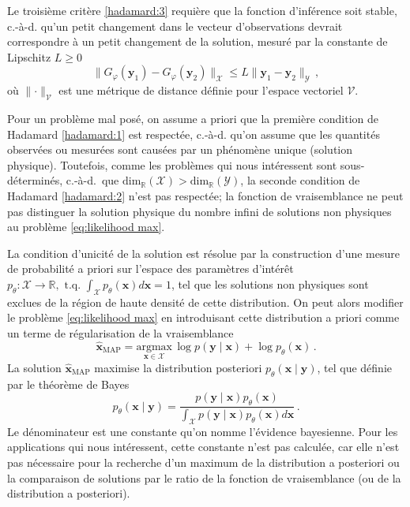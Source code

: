 Le troisième critère \ref{hadamard:3} requière que la fonction d'inférence soit stable, c.-à-d. qu'un petit changement 
dans le vecteur d'observations devrait correspondre à un petit changement de la solution, mesuré par la constante de Lipschitz
$L \geq 0$
\begin{equation}\label{eq:Lipschitz}
        \lVert G_\varphi(\mathbf{y}_1) - G_\varphi(\mathbf{y}_2)\rVert_{\mathcal{X}} \leq L \lVert \mathbf{y}_1 - \mathbf{y}_2\rVert_{\mathcal{Y}}\, ,
\end{equation}
où $\lVert \cdot \rVert_{\mathcal{V}}$ est une métrique de distance définie pour l'espace vectoriel $\mathcal{V}$.

Pour un problème mal posé,
on assume a priori que la première condition de Hadamard \ref{hadamard:1} est respectée, c.-à-d. qu'on assume 
que les quantités observées ou mesurées sont causées par un phénomène unique (solution physique). 
Toutefois, comme les problèmes qui nous intéressent sont sous-déterminés, 
c.-à-d.\ que $\mathrm{dim}_{\mathbb{R}}(\mathcal{X}) > \mathrm{dim}_{\mathbb{R}}(\mathcal{Y})$,
la seconde condition de Hadamard \ref{hadamard:2} n'est pas respectée; la fonction de vraisemblance 
ne peut pas distinguer la solution physique du nombre infini de solutions non physiques au problème \eqref{eq:likelihood max}.

La condition d'unicité de la solution est résolue par la construction d'une
mesure de probabilité a priori sur l'espace des paramètres d'intérêt 
$p_\theta: \mathcal{X} \rightarrow \mathbb{R}, \,\, \mathrm{t.q.}\,\, \int_{\mathcal{X}} p_\theta(\mathbf{x}) d\mathbf{x} = 1$,
tel que les solutions non physiques sont exclues de la région de haute densité de cette distribution.
On peut alors modifier le problème \eqref{eq:likelihood max} en introduisant cette distribution 
a priori comme un terme de régularisation de la vraisemblance
\begin{equation}\label{eq:MAP intro}
        \hat{\mathbf{x}}_{\mathrm{MAP}} = \underset{\mathbf{x} \in \mathcal{X}}{\mathrm{argmax}}\, \log p(\mathbf{y} \mid \mathbf{x}) + \log p_\theta(\mathbf{x})\, .
\end{equation} 
La solution $\hat{\mathbf{x}}_{\mathrm{MAP}}$ maximise la distribution posteriori $p_\theta(\mathbf{x} \mid \mathbf{y})$, 
tel que définie par le théorème de Bayes
\begin{equation}\label{eq:Bayes}
        p_\theta(\mathbf{x} \mid \mathbf{y}) = \frac{p(\mathbf{y} \mid \mathbf{x}) p_\theta(\mathbf{x})}{\int_{\mathcal{X}} p(\mathbf{\mathbf{y}} \mid \mathbf{x}) p_\theta(\mathbf{x}) d\mathbf{x}}\, .
\end{equation} 
Le dénominateur est une constante qu'on nomme l'évidence bayesienne. 
Pour les applications qui nous intéressent, cette constante n'est pas calculée, 
car elle n'est pas nécessaire  
pour la recherche d'un maximum de la distribution a posteriori ou 
la comparaison de solutions par le ratio de la fonction de vraisemblance (ou de la distribution a posteriori).

